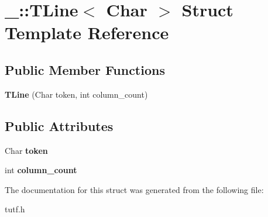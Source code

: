 \hypertarget{struct___1_1_t_line}{}\section{\+\_\+\+:\+:T\+Line$<$ Char $>$ Struct Template Reference}
\label{struct___1_1_t_line}
\subsection*{Public Member Functions}
\begin{DoxyCompactItemize}
\item 
\mbox{\label{struct___1_1_t_line_acf706a08fa8c78f0be00f2768d36bad8}} 
{\bfseries T\+Line} (Char token, int column\+\_\+count)
\end{DoxyCompactItemize}
\subsection*{Public Attributes}
\begin{DoxyCompactItemize}
\item 
\mbox{\label{struct___1_1_t_line_ac437d948bf14b8d7f0dd0e9f6328ae01}} 
Char {\bfseries token}
\item 
\mbox{\label{struct___1_1_t_line_a054c711434445108137e9e84c8a3e794}} 
int {\bfseries column\+\_\+count}
\end{DoxyCompactItemize}


The documentation for this struct was generated from the following file\+:\begin{DoxyCompactItemize}
\item 
tutf.\+h\end{DoxyCompactItemize}
